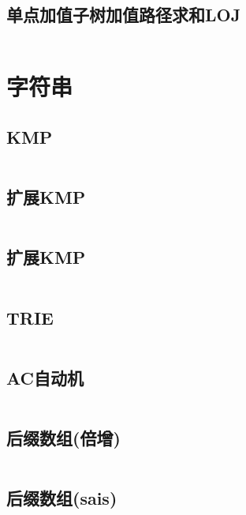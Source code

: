 \subsection{单点加值子树加值路径求和LOJ} 

\inputminted{cpp}{code/单点加值子树加值路径求和LOJ.cc}

\section{字符串} 
\subsection{KMP} 

\inputminted{cpp}{code/KMP.cc}

\subsection{扩展KMP} 

\inputminted{cpp}{code/exKMP.cc}

\subsection{扩展KMP} 

\inputminted{cpp}{code/exkmp2.cc}

\subsection{TRIE} 

\inputminted{cpp}{code/trie.cc}

\subsection{AC自动机} 

\inputminted{cpp}{code/ACautomachine.cc}

\subsection{后缀数组(倍增)} 

\inputminted{cpp}{code/SA.cc}

\subsection{后缀数组(sais)} 

\inputminted{cpp}{code/sais.cc}

